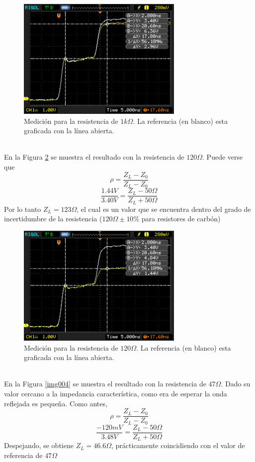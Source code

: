 \documentclass[a4paper,10pt]{article}
\begin{document}
		\begin{figure}[!htb]
			\centering
			\includegraphics[width=8cm]
			{Imagenes/Res1k.png}
			\caption{Medici\'on para la resistencia de $1k\Omega$. La referencia (en blanco) esta graficada con la l\'inea abierta.}
			\label{img002} 
		\end{figure}\\	
	En la Figura \ref{img003} se muestra el resultado con la resistencia de $120\Omega$. Puede verse que $$\rho=\frac{Z_L-Z_0}{Z_L-Z_0}$$
	$$\frac{1.44V}{3.40V}=\frac{Z_L- 50\Omega}{Z_L+50\Omega}$$
	Por lo tanto $Z_L=123\Omega$, el cual es un valor que se encuentra dentro del grado de incertidumbre de la resistencia ($120\Omega \pm 10\%$ para resistores de carb\'on)	
		\begin{figure}[!htb]
			\centering
			\includegraphics[width=8cm]
			{Imagenes/Res120.png}
			\caption{Medici\'on para la resistencia de $120\Omega$. La referencia (en blanco) esta graficada con la l\'inea abierta.}
			\label{img003}
		\end{figure}\\
	En la Figura \ref{img004} se muestra el resultado con la resistencia de $47\Omega$. Dado su valor cercano a la impedancia caracter\'istica, como era de esperar la onda reflejada es peque\~na. Como antes, $$\rho=\frac{Z_L-Z_0}{Z_L-Z_0}$$
	$$\frac{-120mV}{3.48V}=\frac{Z_L- 50\Omega}{Z_L+50\Omega}$$
	Despejando, se obtiene $Z_L=46.6\Omega$, pr\'acticamente coincidiendo con el valor de referencia de $47\Omega$
\end{document}
